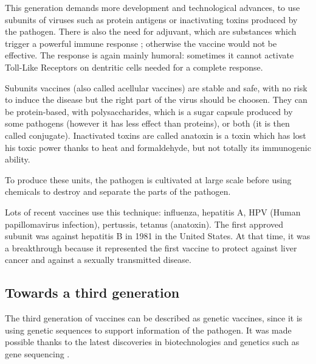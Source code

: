 \documentclass{article}
\begin{document}
            This generation demands more development and technological advances,
                to use subunits of viruses such as protein antigens or inactivating toxins produced by the pathogen. %
            There is also the need for adjuvant, which are substances which trigger a powerful immune response ; otherwise the vaccine would not be effective. 
            The response is again mainly humoral: sometimes it cannot activate Toll-Like Receptors on dentritic cells needed for a complete response.

            Subunits vaccines (also called acellular vaccines) are stable and safe, with no risk to induce the disease but the right part of the virus should be choosen.
                They can be protein-based, with polysaccharides, which is a sugar capsule produced by some pathogens (however it has less effect than proteins), or both (it is then called conjugate).
            Inactivated toxins are called anatoxin is a toxin which has lost his toxic power thanks to heat and formaldehyde, but not totally its immunogenic ability.

            To produce these units, the pathogen is cultivated at large scale before using chemicals to destroy and separate the parts of the pathogen.

            Lots of recent vaccines use this technique: influenza, hepatitis A, HPV (Human papillomavirus infection), pertussis, tetanus (anatoxin). 
                The first approved subunit was against hepatitis B in 1981 in the United States. 
                At that time, it was a breakthrough because it represented the first vaccine to protect against liver cancer and against a sexually transmitted disease.

        \subsection{Towards a third generation}

            The third generation of vaccines can be described as genetic vaccines, since it is using genetic sequences to support information of the pathogen. 
            It was made possible thanks to the latest discoveries in biotechnologies and genetics such as gene sequencing \autocite{chavdaDNAVaccinesSARSCoV22021}.  
\end{document}

